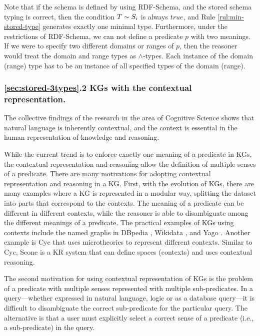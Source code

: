 \documentclass[runningheads]{llncs}
\begin{document}
Note that if the schema is defined by using RDF-Schema, and the stored
schema typing is correct, then the condition $T\sim\/S_i$ is always
$true$, and Rule \ref{rul:min-stored-type} generates exactly one
minimal type. Furthermore, under the restrictions of RDF-Schema, we can
not define a predicate $p$ with two meanings. If we were to specify two
different domains or ranges of $p$, then the reasoner would treat the
domain and range types as $\land$-types. Each instance of the domain
(range) type has to be an instance of all specified types of the
domain (range).

% 



\subsubsection{\ref{sec:stored-3types}.2 KGs with the contextual representation.}

The collective findings of the research in the area of Cognitive
Science \cite{Hollister2017} shows that natural language is inherently
contextual, and the context is essential in the human representation
of knowledge and reasoning. 

While the current trend is to enforce exactly one meaning of a
predicate in KGs, the contextual representation and reasoning allow
the definition of multiple senses of a predicate. There are many
motivations for adopting contextual representation and reasoning in a
KG. First, with the evolution of KGs, there are many examples where a
KG is represented in a modular way, splitting the dataset into parts
that correspond to the contexts. The meaning of a predicate can be
different in different contexts, while the reasoner is able to
disambiguate among the different meanings of a predicate.
The practical examples of KGs using contexts include the named graphs
in DBpedia \cite{Auer2007}, Wikidata \cite{vrandecic2014}, and Yago
\cite{Hoffart2013}. Another example is Cyc \cite{cyc} that uses
microtheories to represent different contexts. Similar to Cyc, Scone
\cite{Fahlman2011} is a KR system that can define spaces (contexts)
and uses contextual reasoning.

The second motivation for using contextual representation of KGs is
the problem of a predicate with multiple senses represented with
multiple sub-predicates. In a query---whether expressed in natural
language, logic or as a database query---it is difficult to
disambiguate the correct sub-predicate for the particular query. The
alternative is that a user must explicitly select a correct sense of
a predicate (i.e., a sub-predicate) in the query.
\end{document}
